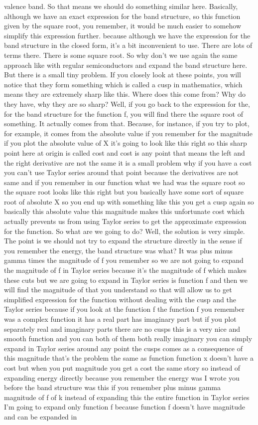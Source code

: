 valence band. So that means we should do something similar here. Basically, although we have an exact expression for the band structure, so this function given by the square root, you remember, it would be much easier to somehow simplify this expression further. because although we have the expression for the band structure in the closed form, it's a bit inconvenient to use. There are lots of terms there. There is some square root. So why don't we use again the same approach like with regular semiconductors and expand the band structure here. But there is a small tiny problem. If you closely look at these points, you will notice that they form something which is called a cusp in mathematics, which means they are extremely sharp like this. Where does this come from? Why do they have, why they are so sharp? Well, if you go back to the expression for the, for the band structure for the function f, you will find there the square root of something. It actually comes from that. Because, for instance, if you try to plot, for example, it comes from the absolute value if you remember for the magnitude if you plot the absolute value of X it's going to look like this right so this sharp point here at origin is called cost and cost is any point that means the left and the right derivative are not the same it is a small problem why if you have a cost you can't use Taylor series around that point because the derivatives are not same and if you remember in our function what we had was the square root so the square root looks like this right but you basically have some sort of square root of absolute X so you end up with something like this you get a cusp again so basically this absolute value this magnitude makes this unfortunate cost which actually prevents us from using Taylor series to get the approximate expression for the function. So what are we going to do? Well, the solution is very simple. The point is we should not try to expand the structure directly in the sense if you remember the energy, the band structure was what? It was plus minus gamma times the magnitude of f you remember so we are not going to expand the magnitude of f in Taylor series because it's the magnitude of f which makes these cuts but we are going to expand in Taylor series is function f and then we will find the magnitude of that you understand so that will allow us to get simplified expression for the function without dealing with the cusp and the Taylor series because if you look at the function f the function f you remember was a complex function it has a real part has imaginary part but if you plot separately real and imaginary parts there are no cusps this is a very nice and smooth function and you can both of them both really imaginary you can simply expand in Taylor series around any point the cusps comes as a consequence of this magnitude that's the problem the same as function function x doesn't have a cost but when you put magnitude you get a cost the same story so instead of expanding energy directly because you remember the energy was I wrote you before the band structure was this if you remember plus minus gamma magnitude of f of k instead of expanding this the entire function in Taylor series I'm going to expand only function f because function f doesn't have magnitude and can be expanded in 